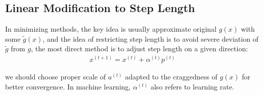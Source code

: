     \subsection{Linear Modification to Step Length}

    In minimizing methods, the key idea is usually approximate original $ g(x) $ with some $ \tilde{g}(x) $, and the idea of restricting step length is to avoid severe deviation of $ \tilde{g} $ from $ g $, the most direct method is to adjust step length on a given direction: 
    \begin{align}
        x^{(t+1)}=x^{(t)}+\alpha ^{(t)}p^{(t)}
    \end{align}
    
    we should choose proper scale of $ a^{(t)} $ adapted to the craggedness of $ g(x) $ for better convergence. In machine learning, $ \alpha ^{(t)} $ also refers to learning rate.
